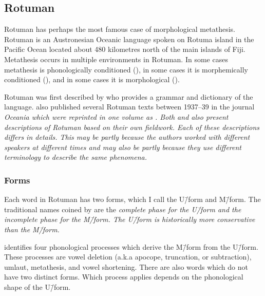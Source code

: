\subsection{Rotuman}\label{sec:Rot}
Rotuman has perhaps the most famous case of morphological metathesis.
Rotuman is an Austronesian Oceanic language spoken on Rotuma island
in the Pacific Ocean located about 480 kilometres north of the main islands of Fiji.
Metathesis occurs in multiple environments in Rotuman.
In some cases metathesis is phonologically conditioned (),
in some cases it is morphemically conditioned (),
and in some cases it is morphological ().

Rotuman was first described by \citet{ch40}
who provides a grammar and dictionary of the language.
\citeauthor{ch39} also published several Rotuman texts
between 1937--39 in the journal \it{Oceania}
which were reprinted in one volume as \citet{ch39}.
Both \citet{be87} and \citet{va02} also present descriptions of
Rotuman based on their own fieldwork.
Each of these descriptions differs in details.
This may be partly because the authors worked with different
speakers at different times and may also be partly because they use
different terminology to describe the same phenomena.

\subsubsection{Forms}\label{sec:RotFor}
Each word in Rotuman has two forms, which I call the U\=/form and M\=/form.
The traditional names coined by \cite{ch40} are the \it{complete phase} for the U\=/form
and the \it{incomplete phase} for the M\=/form.
The U\=/form is historically more conservative than the M\=/form.

\cite{ch40} identifies four phonological processes
which derive the M\=/form from the U\=/form.
These processes are vowel deletion (a.k.a apocope, truncation, or subtraction),
umlaut, metathesis, and vowel shortening.
There are also words which do not have two distinct forms.
Which process applies depends on the phonological shape of the U\=/form.


